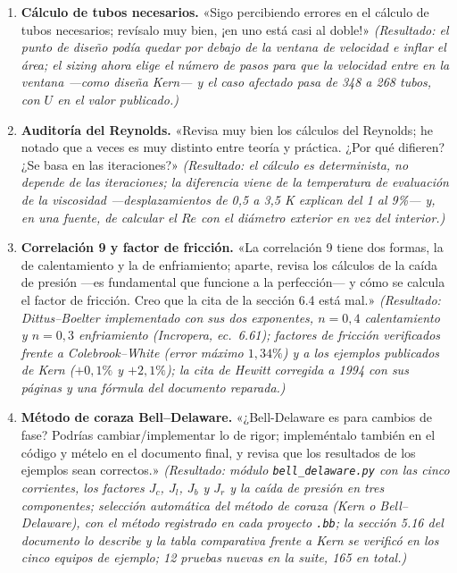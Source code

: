 \documentclass[11pt,a4paper]{article}
\begin{document}
\begin{enumerate}
\emph{(Resultado: PyInstaller incluía PIL sin usar; excluido, el arranque
pasó de 12--25 s a 2,5 s (\emph{onefile}) y 0,35 s (versión rápida); la
confianza se respaldó con la suite de 153 pruebas y los scripts de
verificación incluidos en la entrega.)}
\item \textbf{Cálculo de tubos necesarios.} «Sigo percibiendo errores en el
cálculo de tubos necesarios; revísalo muy bien, ¡en uno está casi al
doble!» \emph{(Resultado: el punto de diseño podía quedar por debajo de la
ventana de velocidad e inflar el área; el \emph{sizing} ahora elige el
número de pasos para que la velocidad entre en la ventana ---como diseña
Kern--- y el caso afectado pasa de 348 a 268 tubos, con $U$ en el valor
publicado.)}
\item \textbf{Auditoría del Reynolds.} «Revisa muy bien los cálculos del
Reynolds; he notado que a veces es muy distinto entre teoría y práctica.
¿Por qué difieren? ¿Se basa en las iteraciones?» \emph{(Resultado: el
cálculo es determinista, no depende de las iteraciones; la diferencia viene
de la temperatura de evaluación de la viscosidad ---desplazamientos de 0,5 a
3,5 K explican del 1 al 9\%--- y, en una fuente, de calcular el $Re$ con el
diámetro exterior en vez del interior.)}
\item \textbf{Correlación 9 y factor de fricción.} «La correlación 9 tiene
dos formas, la de calentamiento y la de enfriamiento; aparte, revisa los
cálculos de la caída de presión ---es fundamental que funcione a la
perfección--- y cómo se calcula el factor de fricción. Creo que la cita de
la sección 6.4 está mal.» \emph{(Resultado: Dittus--Boelter implementado con
sus dos exponentes, $n = 0{,}4$ calentamiento y $n = 0{,}3$ enfriamiento
(Incropera, ec.~6.61); factores de fricción verificados frente a
Colebrook--White (error máximo $1{,}34\%$) y a los ejemplos publicados de
Kern ($+0{,}1\%$ y $+2{,}1\%$); la cita de Hewitt corregida a 1994 con sus
páginas y una fórmula del documento reparada.)}
\item \textbf{Método de coraza Bell--Delaware.} «¿Bell-Delaware es para cambios
de fase? Podrías cambiar/implementar lo de rigor; impleméntalo también en el
código y mételo en el documento final, y revisa que los resultados de los
ejemplos sean correctos.» \emph{(Resultado: módulo \texttt{bell\_delaware.py}
con las cinco corrientes, los factores $J_c$, $J_l$, $J_b$ y $J_r$ y la caída
de presión en tres componentes; selección automática del método de coraza (Kern o Bell--Delaware), 
con el método registrado en cada proyecto \texttt{.bb}; la sección 5.16
del documento lo describe y la tabla comparativa frente a Kern se verificó en
los cinco equipos de ejemplo; 12 pruebas nuevas en la suite, 165 en total.)}
\end{enumerate}
\end{document}
